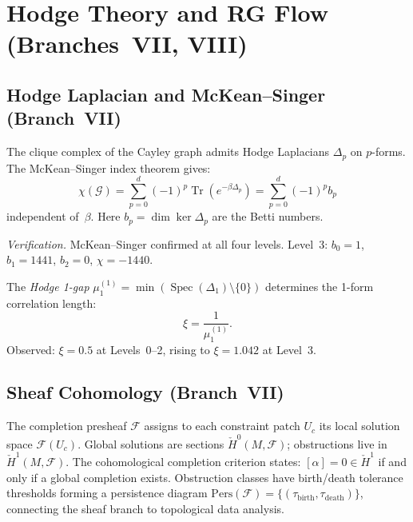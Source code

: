 \documentclass[12pt,reqno]{amsart}
\theoremstyle{plain}
\theoremstyle{definition}
\theoremstyle{remark}
\DeclareMathOperator{\Tr}{Tr}
\DeclareMathOperator{\Spec}{Spec}
\begin{document}
\section{Hodge Theory and RG Flow (Branches~VII, VIII)}%
\label{sec:topology}

\subsection{Hodge Laplacian and McKean--Singer (Branch~VII)}

The clique complex of the Cayley graph admits Hodge Laplacians
$\Delta_p$ on $p$-forms.  The McKean--Singer index theorem gives:
\begin{equation}\label{eq:mckean_singer}
  \chi(\mathcal{G}) = \sum_{p=0}^{d} (-1)^p \Tr(e^{-\beta \Delta_p})
  = \sum_{p=0}^{d} (-1)^p b_p
\end{equation}
independent of~$\beta$.  Here $b_p = \dim \ker \Delta_p$ are the
Betti numbers.

\emph{Verification.}  McKean--Singer confirmed at all four levels.
Level~3: $b_0 = 1$, $b_1 = 1441$, $b_2 = 0$, $\chi = -1440$.

The \emph{Hodge 1-gap} $\mu_1^{(1)} = \min(\Spec(\Delta_1)
\setminus \{0\})$ determines the 1-form correlation length:
\begin{equation}\label{eq:xi_hodge}
  \xi = \frac{1}{\mu_1^{(1)}}.
\end{equation}
Observed: $\xi = 0.5$ at Levels~0--2, rising to $\xi = 1.042$ at
Level~3.

\subsection{Sheaf Cohomology (Branch~VII)}

The completion presheaf $\mathscr{F}$ assigns to each constraint patch
$U_c$ its local solution space $\mathscr{F}(U_c)$.  Global solutions
are sections $\check{H}^0(M, \mathscr{F})$; obstructions live in
$\check{H}^1(M, \mathscr{F})$.  The cohomological completion
criterion states: $[\alpha] = 0 \in \check{H}^1$ if and only if a
global completion exists.  Obstruction classes have birth/death
tolerance thresholds forming a persistence diagram $\mathrm{Pers}
(\mathscr{F}) = \{(\tau_{\mathrm{birth}}, \tau_{\mathrm{death}})\}$,
connecting the sheaf branch to topological data analysis.
\end{document}
